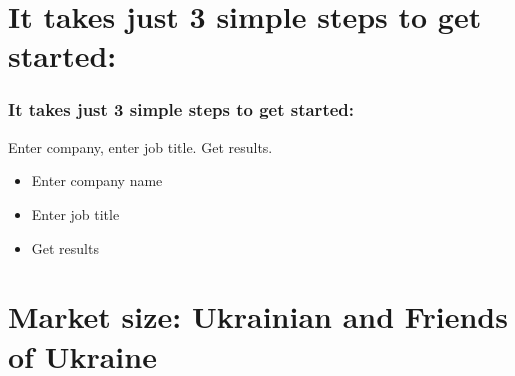 \documentclass{beamer}
\begin{document}
\section{It takes just 3 simple steps to get started:}

\begin{frame}
    \frametitle{It takes just 3 simple steps to get started:}
    
    \begin{block}{Enter company, enter job title. Get results.}
        \begin{itemize}
            \item Enter company name
            \item Enter job title
            \item Get results
        \end{itemize}
    \end{block}
    
\end{frame}

\section{Market size: Ukrainian and Friends of Ukraine}
\end{document}

